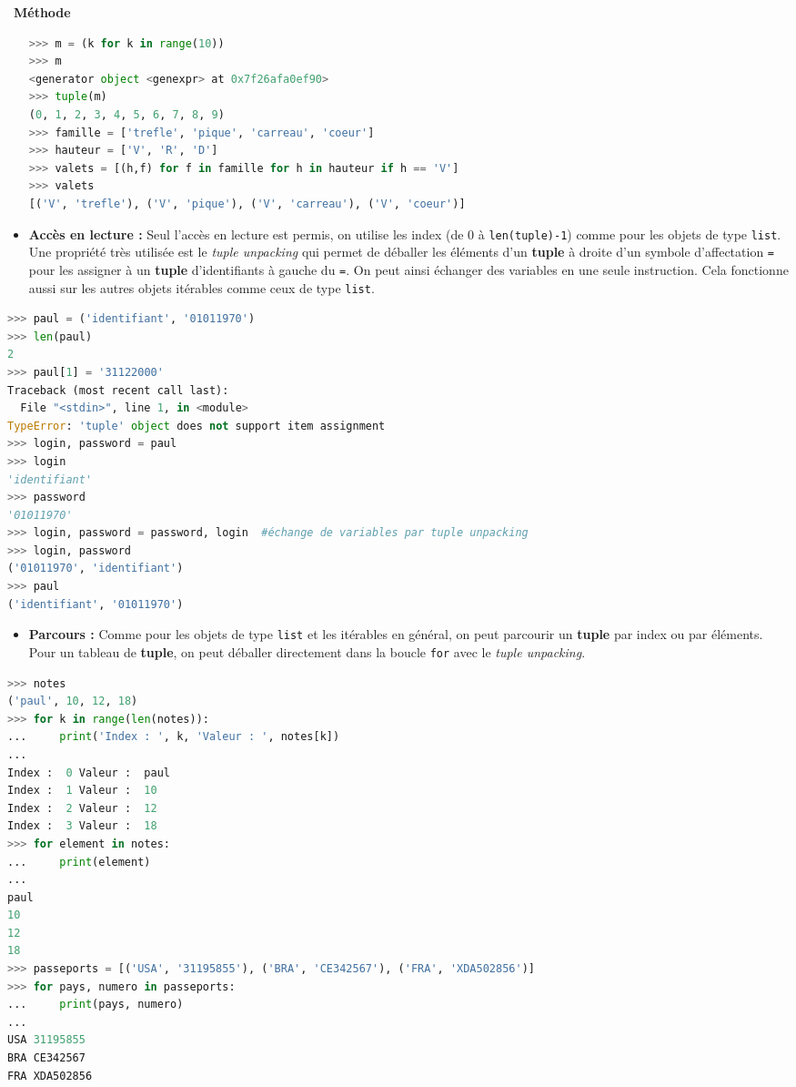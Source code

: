 \documentclass[
  11pt,
]{article}
\newcommand{\passthrough}[1]{#1}
\providecommand{\tightlist}{%
  \setlength{\itemsep}{0pt}\setlength{\parskip}{0pt}}
\newcounter{prop}
\newcounter{cours}
\newcounter{logi}
\newenvironment{methode}[1]
{\par \medskip    \noindent  
 \begin {bclogo}[arrondi =0.1,logo=\bcoutil, marge=4,noborder = true] {~\textbf{Méthode}   {\itshape #1} }  \par}
{
\end{bclogo}
 \par \bigskip }
\begin{document}
\begin{methode}{}
\begin{itemize}
\begin{lstlisting}[language=Python]
>>> m = (k for k in range(10))
>>> m
<generator object <genexpr> at 0x7f26afa0ef90>
>>> tuple(m)
(0, 1, 2, 3, 4, 5, 6, 7, 8, 9)
>>> famille = ['trefle', 'pique', 'carreau', 'coeur']
>>> hauteur = ['V', 'R', 'D']
>>> valets = [(h,f) for f in famille for h in hauteur if h == 'V']
>>> valets
[('V', 'trefle'), ('V', 'pique'), ('V', 'carreau'), ('V', 'coeur')]
\end{lstlisting}
\item
  \textbf{Accès en lecture :} Seul l'accès en lecture est permis, on
  utilise les index (de 0 à \passthrough{\lstinline!len(tuple)-1!})
  comme pour les objets de type \passthrough{\lstinline!list!}. Une
  propriété très utilisée est le \emph{tuple unpacking} qui permet de
  déballer les éléments d'un \textbf{tuple} à droite d'un symbole
  d'affectation \passthrough{\lstinline!=!} pour les assigner à un
  \textbf{tuple} d'identifiants à gauche du \passthrough{\lstinline!=!}.
  On peut ainsi échanger des variables en une seule instruction. Cela
  fonctionne aussi sur les autres objets itérables comme ceux de type
  \passthrough{\lstinline!list!}.
\end{itemize}

\begin{lstlisting}[language=Python]
>>> paul = ('identifiant', '01011970')
>>> len(paul)
2
>>> paul[1] = '31122000'
Traceback (most recent call last):
  File "<stdin>", line 1, in <module>
TypeError: 'tuple' object does not support item assignment
>>> login, password = paul
>>> login
'identifiant'
>>> password
'01011970'
>>> login, password = password, login  #échange de variables par tuple unpacking
>>> login, password
('01011970', 'identifiant')
>>> paul
('identifiant', '01011970')
\end{lstlisting}

\begin{itemize}
\tightlist
\item
  \textbf{Parcours :} Comme pour les objets de type
  \passthrough{\lstinline!list!} et les itérables en général, on peut
  parcourir un \textbf{tuple} par index ou par éléments. Pour un tableau
  de \textbf{tuple}, on peut déballer directement dans la boucle
  \passthrough{\lstinline!for!} avec le \emph{tuple unpacking}.
\end{itemize}

\begin{lstlisting}[language=Python]
>>> notes
('paul', 10, 12, 18)
>>> for k in range(len(notes)):
...     print('Index : ', k, 'Valeur : ', notes[k])
... 
Index :  0 Valeur :  paul
Index :  1 Valeur :  10
Index :  2 Valeur :  12
Index :  3 Valeur :  18
>>> for element in notes:
...     print(element)
... 
paul
10
12
18
>>> passeports = [('USA', '31195855'), ('BRA', 'CE342567'), ('FRA', 'XDA502856')]
>>> for pays, numero in passeports:
...     print(pays, numero)
... 
USA 31195855
BRA CE342567
FRA XDA502856
\end{lstlisting}


\end{methode}
\end{document}
